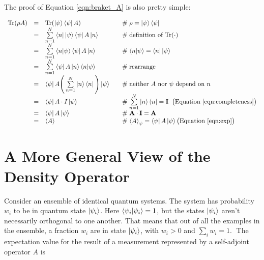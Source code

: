\documentclass[11pt, oneside]{article}   	%
\begin{document}
\bigskip
\noindent
The proof of Equation \ref{eqn:braket_A} is also pretty simple:

\begin{equation*}
\begin{array}{rcll}
\text{Tr}(\rho A) 
&=& \text{Tr}(\ket{\psi} \bra{\psi}  A)                                                                      & \quad \mathrel{\#} \rho = \ket{\psi} \bra{\psi} \\
&=& \sum\limits_{n = 1}^{N} \bra{n} \ket{\psi} \bra{\psi} A \ket{n}                          & \quad \mathrel{\#} \text{definition of Tr($\cdot$)} \\
&=& \sum\limits_{n = 1}^{N} \braket{n | \psi} \bra{\psi} A \ket{n}                           & \quad \mathrel{\#}  \braket{n | \psi}  =  \bra{n} \ket{\psi}  \\
&=& \sum\limits_{n = 1}^{N} \bra{\psi} A \ket{n} \braket{n | \psi}                           & \quad \mathrel{\#} \text{rearrange} \\
&=& \bra{\psi}  A \Bigg (\sum\limits_{n = 1}^{N} \ket{n} \bra{n} \Bigg ) \ket{\psi}   & \quad \mathrel{\#} \text{neither $A$ nor $\psi$ depend on $n$} \\
&=& \bra{\psi} A  \cdot I  \ket{\psi}                                                                         & \quad \mathrel{\#} \sum\limits_{n = 1}^{N} \ket{n} \bra{n} = \mathbf{I} \;\; \text{\big (Equation \ref{eqn:completeness}} \big )  \\
&=& \bra{\psi} A \ket{\psi}                                                                                      & \quad  \mathrel{\#} \mathbf{A} \cdot \mathbf{I} = \mathbf{A} \\
&=& \braket{A}                                                                                                      & \quad \mathrel{\#} \braket{A}_{\psi} = \bra{\psi} A \ket{\psi}   \big (\text{Equation } \ref{eqn:exp} \big )
\end{array}
\end{equation*}

\bigskip
\section{A More General View of the Density Operator}
Consider an ensemble of identical quantum systems. The system has probability $w_i$ to be in quantum state $\ket{\psi_i}$.  Here $\braket{\psi_i | \psi_i} = 1$,  but
the states $\ket{\psi_i}$ aren't necessarily orthogonal to one another.   That means that out of all the examples in the ensemble, a fraction $w_i$  are in state $\ket{\psi_i}$, with
$w_i  >  0$ and $\sum\limits_{i} w_i = 1$.
\bigskip
\noindent
The expectation value for the result of a measurement represented by a self-adjoint operator $A$ is
\end{document}
